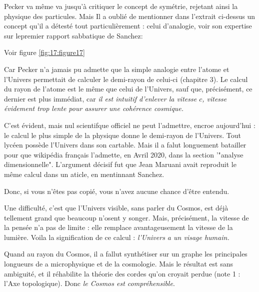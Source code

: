 \documentclass[a4paper,12pt]{article}
\begin{document}
Pecker va même va jusqu'à critiquer le concept de symétrie, rejetant ainsi la physique des particules. Mais Il a oublié de mentionner dans l'extrait ci-dessus un concept qu'il a détesté tout particulièrement : celui d'analogie, voir son expertise sur lepremier rapport sabbatique de Sanchez:

Voir figure \ref{fig:17:figure17}



Car Pecker n'a jamais pu admette que la simple analogie entre l'atome et l'Univers permettait de calculer le demi-rayon de celui-ci (chapitre 3). Le calcul du rayon de l'atome est le même que celui de l'Univers, sauf que, précisément, ce dernier est plus immédiat, car \textit{il est intuitif d'enlever la vitesse $c$, vitesse évidement trop lente pour assurer une cohérence cosmique.}


C'est évident, mais nul scientifque officiel ne peut l'admettre, encroe aujourd'hui : le calcul le plus simple de la physique donne le demi-rayon de l'Univers. Tout lycéen possède l'Univers dans son cartable. Mais il a falut longuement batailler pour que wikipédia français l'admette, en Avril 2020, dans la section '"analyse dimensionnelle". L'argument décisif fut que Jean Maruani avait reproduit le m\^eme calcul dans un aticle, en mentinnant Sanchez. 

Donc, si vous n'êtes pas copié, vous n'avez aucune chance d'être entendu.

Une difficulté, c'est que l'Univers visible, sans parler du Cosmos, est déjà tellement grand que beaucoup n'osent y songer. Mais, précisément, la vitesse de la pensée n'a pas de limite : elle remplace avantageusement la vitesse de la lumière. Voila la signification de ce calcul : \textit{l'Univers a un visage humain.}


Quand au rayon du Cosmos, il a fallut synthétiser sur un graphe les principales longueurs de a microphysique et de la cosmologie. Mais le résultat est sans ambiguité, et il réhabilite la théorie des cordes qu'on croyait perdue (note 1 : l'Axe topologique). Donc \textit {le Cosmos est compréhensible}.
\end{document}
